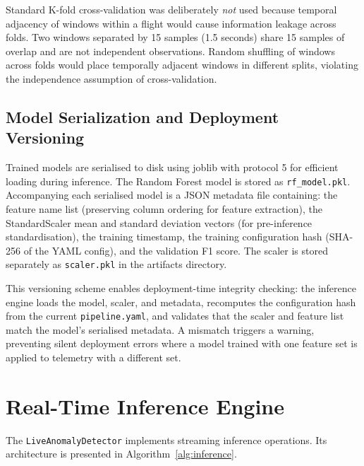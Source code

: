 Standard K-fold cross-validation was deliberately \emph{not} used because temporal adjacency of windows within a flight would cause information leakage across folds. Two windows separated by 15 samples (1.5 seconds) share 15 samples of overlap and are not independent observations. Random shuffling of windows across folds would place temporally adjacent windows in different splits, violating the independence assumption of cross-validation.

\subsection{Model Serialization and Deployment Versioning}

Trained models are serialised to disk using joblib with protocol 5 for efficient loading during inference. The Random Forest model is stored as \texttt{rf\_model.pkl}. Accompanying each serialised model is a JSON metadata file containing: the feature name list (preserving column ordering for feature extraction), the StandardScaler mean and standard deviation vectors (for pre-inference standardisation), the training timestamp, the training configuration hash (SHA-256 of the YAML config), and the validation F1 score. The scaler is stored separately as \texttt{scaler.pkl} in the artifacts directory.

This versioning scheme enables deployment-time integrity checking: the inference engine loads the model, scaler, and metadata, recomputes the configuration hash from the current \texttt{pipeline.yaml}, and validates that the scaler and feature list match the model's serialised metadata. A mismatch triggers a warning, preventing silent deployment errors where a model trained with one feature set is applied to telemetry with a different set.

\section{Real-Time Inference Engine}

The \texttt{LiveAnomalyDetector} implements streaming inference operations. Its architecture is presented in Algorithm~\ref{alg:inference}.

